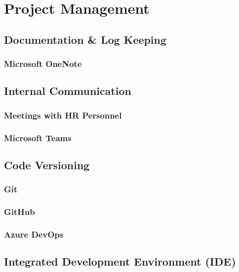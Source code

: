 \chapter{Project Management}

\section{Documentation \& Log Keeping}

    \subsection{Microsoft OneNote}

\section{Internal Communication}

    \subsection{Meetings with HR Personnel}

    \subsection{Microsoft Teams}

\section{Code Versioning}

    \subsection{Git}

    \subsection{GitHub}

    \subsection{Azure DevOps}

\section{Integrated Development Environment (IDE)}

